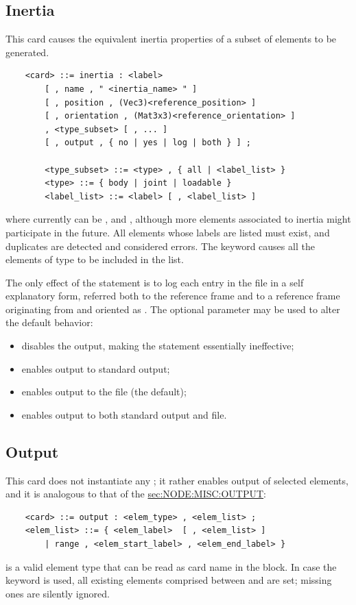 \subsection{Inertia}\label{sec:EL:MISC:INERTIA}
This card causes the equivalent inertia properties of a subset
of elements to be generated.
\begin{verbatim}
    <card> ::= inertia : <label>
        [ , name , " <inertia_name> " ]
        [ , position , (Vec3)<reference_position> ]
        [ , orientation , (Mat3x3)<reference_orientation> ]
        , <type_subset> [ , ... ]
        [ , output , { no | yes | log | both } ] ;

        <type_subset> ::= <type> , { all | <label_list> }
        <type> ::= { body | joint | loadable }
        <label_list> ::= <label> [ , <label_list> ]
\end{verbatim}
where  currently can be ,  and , 
although more elements associated to inertia might participate in the future.
All elements whose labels are listed must exist, and duplicates
are detected and considered errors.
The keyword  causes all the elements of type  
to be included in the list.

\noindent
The only effect of the  statement is to log
each  entry in the  file in a self explanatory form,
referred both to the  reference frame and to a reference frame
originating from  and oriented 
as .
The optional parameter  may be used to alter the default 
behavior:
\begin{itemize}
\item {} disables the output, making the  
statement essentially ineffective;
\item {} enables output to standard output;
\item {} enables output to the  file (the default);
\item {} enables output to both standard output and  file.
\end{itemize}



\subsection{Output}\label{sec:EL:MISC:OUTPUT}
This card does not instantiate any ; it rather enables
output of selected elements, and it is analogous to that of the
\hyperref{\kw{nodes}}{\kw{nodes} (see Section~}{)}{sec:NODE:MISC:OUTPUT}:
\begin{verbatim}
    <card> ::= output : <elem_type> , <elem_list> ;
    <elem_list> ::= { <elem_label>  [ , <elem_list> ]
        | range , <elem_start_label> , <elem_end_label> }
\end{verbatim}
 is a valid element type that can be read 
as card name in the  block.
In case the keyword  is used, all existing elements comprised
between  and 
are set; missing ones are silently ignored.





